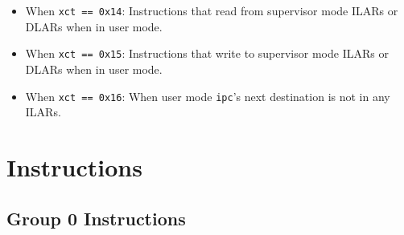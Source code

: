 \documentclass{article}
\begin{document}
\begin{itemize}
	\item When \texttt{xct == 0x14}:
		Instructions that read from supervisor mode ILARs or DLARs when in
		user mode.
	\item When \texttt{xct == 0x15}:
		Instructions that write to supervisor mode ILARs or DLARs when in
		user mode.
	\item When \texttt{xct == 0x16}:
		When user mode \texttt{ipc}'s next destination is not in any ILARs.
	\end{itemize}
	\newpage
\section{Instructions}
	\subsection{Group 0 Instructions}
\end{document}
